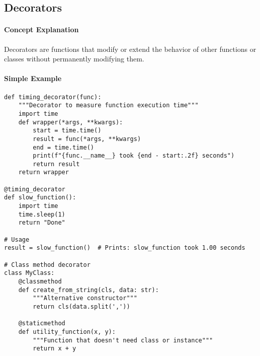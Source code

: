 \subsection{Decorators}

\paragraph{Concept Explanation}
Decorators are functions that modify or extend the behavior of other functions or classes without permanently modifying them.

\paragraph{Simple Example}
\begin{lstlisting}[caption=Decorator Examples]
def timing_decorator(func):
    """Decorator to measure function execution time"""
    import time
    def wrapper(*args, **kwargs):
        start = time.time()
        result = func(*args, **kwargs)
        end = time.time()
        print(f"{func.__name__} took {end - start:.2f} seconds")
        return result
    return wrapper

@timing_decorator
def slow_function():
    import time
    time.sleep(1)
    return "Done"

# Usage
result = slow_function()  # Prints: slow_function took 1.00 seconds

# Class method decorator
class MyClass:
    @classmethod
    def create_from_string(cls, data: str):
        """Alternative constructor"""
        return cls(data.split(','))
    
    @staticmethod
    def utility_function(x, y):
        """Function that doesn't need class or instance"""
        return x + y
\end{lstlisting}

